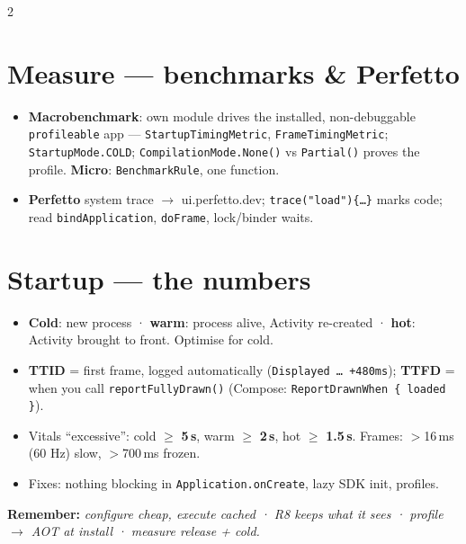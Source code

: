\documentclass[8pt]{extarticle}
\begin{document}
\begin{multicols}{2}
\section{Measure — benchmarks \& Perfetto}
\begin{itemize}\raggedright
  \item \textbf{Macrobenchmark}: own module drives the installed, non-debuggable
        \texttt{profileable} app — \texttt{StartupTimingMetric}, \texttt{FrameTimingMetric};
        \texttt{StartupMode.COLD}; \texttt{CompilationMode.None()} vs \texttt{Partial()}
        proves the profile. \textbf{Micro}: \texttt{BenchmarkRule}, one function.
  \item \textbf{Perfetto} system trace $\to$ ui.perfetto.dev; \texttt{trace("load")\{…\}}
        marks code; read \texttt{bindApplication}, \texttt{doFrame}, lock/binder waits.
\end{itemize}

\section{Startup — the numbers}
\begin{itemize}\raggedright
  \item \textbf{Cold}: new process · \textbf{warm}: process alive, Activity re-created ·
        \textbf{hot}: Activity brought to front. Optimise for cold.
  \item \textbf{TTID} = first frame, logged automatically (\texttt{Displayed … +480ms});
        \textbf{TTFD} = when you call \texttt{reportFullyDrawn()} (Compose:
        \texttt{ReportDrawnWhen \{ loaded \}}).
  \item Vitals ``excessive'': cold $\geq$ \textbf{5\,s}, warm $\geq$ \textbf{2\,s}, hot
        $\geq$ \textbf{1.5\,s}. Frames: $>$16\,ms (60 Hz) slow, $>$700\,ms frozen.
  \item Fixes: nothing blocking in \texttt{Application.onCreate}, lazy SDK init, profiles.
\end{itemize}

\textbf{Remember:} \emph{configure cheap, execute cached · R8 keeps what it sees · profile
$\to$ AOT at install · measure release + cold.}


\end{multicols}

\end{document}
